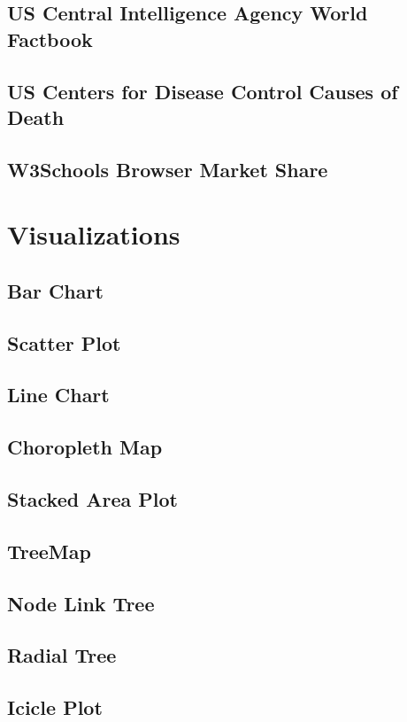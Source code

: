 \documentclass[12pt]{article}
\begin{document}
\begin{doublespace}
\subsection{US Central Intelligence Agency World Factbook}
\subsection{US Centers for Disease Control Causes of Death}
\subsection{W3Schools Browser Market Share}

\pagebreak
\section{Visualizations}
\subsection{Bar Chart}
\subsection{Scatter Plot}
\subsection{Line Chart}
\subsection{Choropleth Map}
\subsection{Stacked Area Plot}
\subsection{TreeMap}
\subsection{Node Link Tree}
\subsection{Radial Tree}
\subsection{Icicle Plot}

\end{doublespace}
\end{document}
